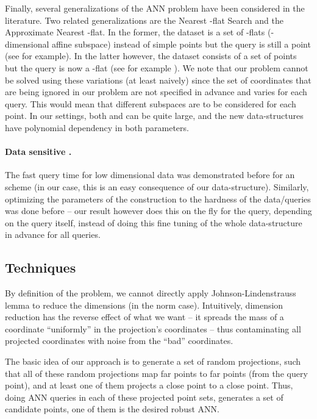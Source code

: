 \documentclass[12pt]{article}\usepackage[cm]{fullpage}
\newcommand{\Term}[1]{\textsf{#1}}
\theoremstyle{remark}\theoremheaderfont{\sf}\theorembodyfont{\upshape}\newtheorem{defn}[theorem]{Definition}
\numberwithin{figure}{section}\numberwithin{table}{section}\numberwithin{equation}{section}
\newcommand{\ANN}{\Term{ANN}\xspace}\newcommand{\NN}{\Term{NN}\xspace}
\begin{document}
Finally, several generalizations of the \ANN problem have been
considered in the literature. Two related generalizations are the
Nearest -flat Search and the Approximate Nearest -flat. In the
former, the dataset is a set of -flats (-dimensional affine
subspace) instead of simple points but the query is still a point (see
\cite{m-anlsh-15} for example). In the latter however, the dataset
consists of a set of points but the query is now a -flat (see for
example \cite{aikn-alnnh-09, mnss-akfnn-14}). We note that our problem
cannot be solved using these variations (at least naively) since the
set of coordinates that are being ignored in our problem are not
specified in advance and varies for each query. This would mean that
 different subspaces are to be considered for each point.
In our settings, both  and  can be quite large, and the new
data-structures have polynomial dependency in both parameters.

\paragraph{Data sensitive \LSH.}

The fast query time for low dimensional data was demonstrated before
for an \LSH scheme \cite[Appendix A]{diim-lshsb-04} (in our case, this
is an easy consequence of our data-structure).  Similarly, optimizing
the parameters of the \LSH construction to the hardness of the
data/queries was done before \cite[Section 4.3.1]{adiim-lshus-06} --
our result however does this on the fly for the query, depending on
the query itself, instead of doing this fine tuning of the whole
data-structure in advance for all queries.

\subsection{Techniques}

By definition of the problem, we cannot directly apply
Johnson-Lindenstrauss lemma to reduce the dimensions (in the 
norm case). Intuitively, dimension reduction has the reverse effect of
what we want -- it spreads the mass of a coordinate ``uniformly'' in
the projection's coordinates -- thus contaminating all projected
coordinates with noise from the ``bad'' coordinates.


The basic idea of our approach is to generate a set of random
projections, such that all of these random projections map far points
to far points (from the query point), and at least one of them
projects a close point to a close point. Thus, doing \ANN queries in
each of these projected point sets, generates a set of candidate
points, one of them is the desired robust \ANN.
\end{document}
